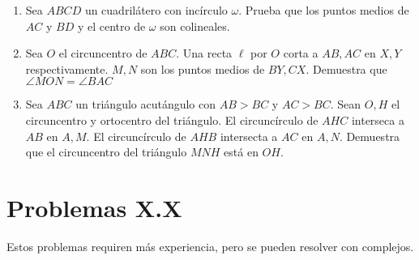 \documentclass[11pt]{scrartcl}
\begin{document}
\begin{enumerate}
   \item Sea $ABCD$ un cuadrilátero con incírculo $\omega$. Prueba que los puntos medios de $AC$ y $BD$ y el centro de $\omega$ son colineales.
   \item Sea $O$ el circuncentro de $ABC$. Una recta $\ell$ por $O$ corta a $AB, AC$ en $X, Y$ respectivamente. $M, N$ son los puntos medios de $BY, CX$. Demuestra que $\angle MON = \angle BAC$
   \item Sea $ABC$ un triángulo acutángulo con $AB>BC$ y $AC>BC$. Sean $O, H$ el circuncentro y ortocentro del triángulo. El circuncírculo de $AHC$ interseca a $AB$ en $A, M$. El circuncírculo de $AHB$ intersecta a $AC$ en $A, N$. Demuestra que el circuncentro del triángulo $MNH$ está en $OH$. 
\end{enumerate}

\section {Problemas X.X}
Estos problemas requiren más experiencia, pero se pueden resolver con complejos.
\end{document}
